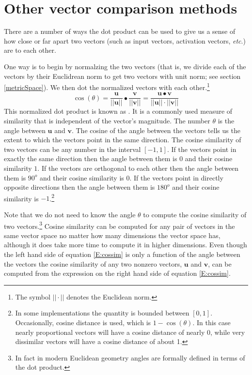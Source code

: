 \section{Other vector comparison methods}\label{vector_comparisons}

   There are a number of ways the dot product can be used to give us a sense of
how close or far apart two vectors (such as input vectors, activation vectors, 
\emph{etc}.) are to each other.  


   One way is to begin by normalzing the two vectors (that is, we divide each
of the vectors by their Euclidrean norm to get two vectors with unit norm; see 
section \ref{metricSpace}).  We then dot the normalized vectors with each 
other.\footnote{The symbol $||\cdot||$ denotes the Euclidean norm.}
\begin{equation}\label{E:cossim}
\cos(\theta) = 
\frac{\mathbf{u}}{|| \mathbf{u}||}  \bullet 
\frac{\mathbf{v}}{|| \mathbf{v}||} =
\frac{\mathbf{u} \bullet \mathbf{v}}{|| \mathbf{u}||  \cdot 
||\mathbf{v}||}
\end{equation}
This normalized dot product is known as .  It is a 
commonly used measure of similarity that is independent of the vector's 
magnitude.  The number $\theta$ is the angle between $\mathbf{u}$ and 
$\mathbf{v}$.  The cosine of the angle between the vectors tells us the extent 
to which the vectors point in the same direction.  The cosine similarity of two 
vectors can be any number in the interval $[-1, 1]$.  If the vectors point in 
exactly the same direction then the angle between them is $0$ and their cosine 
similarity $1$.  If the vectors are orthogonal to each other then the angle 
between them is $90^o$ and their cosine similarity is $0$.  If the vectors 
point in directly opposite directions then the angle between them is $180^o$ 
and their cosine similarity is $-1$.\footnote{In some implementations the
quantity is bounded between $[0,1]$.  Occasionally, cosine distance is used, 
which is $1 - \cos(\theta)$.  In this case nearly proportional vectors 
will have a cosine distance of nearly 0, while very dissimilar vectors will 
have a cosine distance of about 1.}

   Note that we do not need to know the angle $\theta$ to compute the
cosine similarity of two vectors.\footnote{In fact in modern Euclidean geometry 
angles are formally defined in terms of the dot product.}  Cosine
similarity can be computed for any pair of vectors in the same vector space no 
matter how many dimensions the vector space has, although it does take more
time to compute it in higher dimensions.  Even though the left hand side of 
equation \eqref{E:cossim} is only a function of the angle between the vectors 
the cosine similarity of any two nonzero vectors, $\mathbf{u}$ and 
$\mathbf{v}$, can be computed from the expression on the right hand side of 
equation \eqref{E:cossim}.

